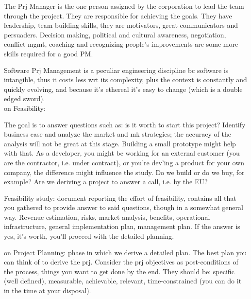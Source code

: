 \noindent The Prj Manager is the one person assigned by the corporation to lead the team through the project. They are responsible for achieving the goals. They have leadership, team building skills, they are motivators, great communicators and persuaders. Decision making, political and cultural awareness, negotiation, conflict mgmt, coaching and recognizing people's improvements are some more skills required for a good PM.

\noindent Software Prj Management is a peculiar engineering discipline bc software is intangible, thus it costs less wrt its complexity, plus the context is constantly and quickly evolving, and because it's ethereal it's easy to change (which is a double edged sword).\\

\noindent on Feasibility:

\noindent The goal is to answer questions such as: is it worth to start this project? Identify business case and analyze the market and mk strategies; the accuracy of the analysis will not be great at this stage.  Building a small prototype might help with that. As a developer, you might be working for an external customer (you are the contractor, i.e. under contract), or you're dev'ing a product for your own company, the difference might influence the study. Do we build or do we buy, for example? Are we deriving a project to answer a call, i.e. by the EU?


\noindent Feasibility study: document reporting the effort of feasibility, contains all that you gathered to provide answer to said questions, though in a somewhat general way. Revenue estimation, risks, market analysis, benefits, operational infrastructure, general implementation plan, management plan. If the answer is yes, it's worth, you'll proceed with the detailed planning.

\noindent on Project Planning: phase in which we derive a detailed plan. The best plan you can think of to derive the prj. Consider the prj objectives as post-conditions of the process, things you want to get done by the end. They should be: specific (well defined), measurable, achievable, relevant, time-constrained (you can do it in the time at your disposal).

